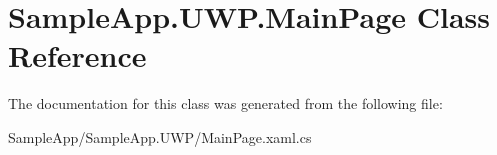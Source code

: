 \hypertarget{class_sample_app_1_1_u_w_p_1_1_main_page}{}\section{Sample\+App.\+U\+W\+P.\+Main\+Page Class Reference}
\label{class_sample_app_1_1_u_w_p_1_1_main_page}


The documentation for this class was generated from the following file\+:\begin{DoxyCompactItemize}
\item 
Sample\+App/\+Sample\+App.\+U\+W\+P/Main\+Page.\+xaml.\+cs\end{DoxyCompactItemize}
